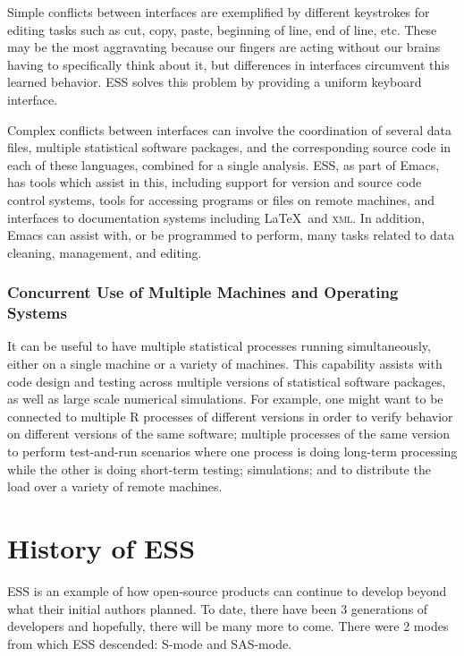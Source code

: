 \documentclass{article}
\begin{document}
Simple conflicts between interfaces are exemplified by different
keystrokes for editing tasks such as cut, copy, paste, beginning of
line, end of line, etc.  These may be the most aggravating
because our fingers are acting without our brains having to
specifically think about it, but differences in interfaces
circumvent this learned behavior.  ESS solves this problem by
providing a uniform keyboard interface.

Complex conflicts between interfaces can involve the coordination of
several data files, multiple statistical software packages, and the
corresponding source code in each of these languages, combined for a
single analysis.  ESS, as part of Emacs, has tools which assist in
this, including support for version and source code control systems,
tools for accessing programs or files on remote machines, and
interfaces to documentation systems including \LaTeX\ and
\textsc{xml}.  In addition, Emacs can assist with, or be programmed to
perform, many tasks related to data cleaning, management, and editing.


\subsubsection{Concurrent Use of Multiple Machines and Operating
  Systems}
\label{sec:conc-use-mult}

It can be useful to have multiple statistical processes running
simultaneously, either on a single machine or a variety of machines.
This capability assists with code design and testing across multiple
versions of statistical software packages, as well as large scale
numerical simulations.  For example, one might want to be connected to
multiple R processes of different versions in order to verify behavior
on different versions of the same software; multiple processes of the
same version to perform test-and-run scenarios where one process is
doing long-term processing while the other is doing short-term
testing; simulations; and to distribute the load over a variety of
remote machines.

\section{History of ESS}
\label{sec:ESS:history}

ESS is an example of how open-source products can continue to
develop beyond what their initial authors planned.  To date, there have been 3
generations of developers and hopefully, there will be many more to come.
There were 2 modes from which ESS descended:  S-mode and SAS-mode.
\end{document}

